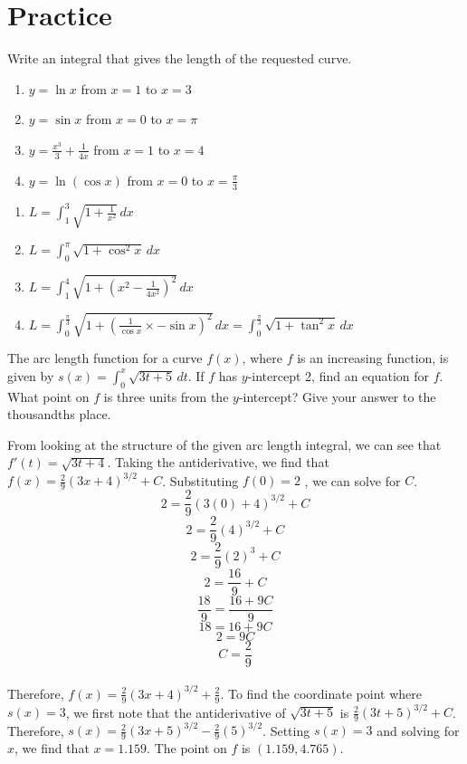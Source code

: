 \section{Practice}

\begin{Exercise}[label=length1]
Write an integral that gives the length of the requested curve.
	\begin{enumerate}
	\item $y = \ln{x}$ from $x = 1$ to $x = 3$
	\item $y = \sin{x}$ from $x = 0$ to $x = \pi$
	\item $y = \frac{x^3}{3} + \frac{1}{4x}$ from $x = 1$ to $x = 4$
	\item $y = \ln{(\cos{x})}$ from $x = 0$ to $x = \frac{\pi}{3}$
	\end{enumerate}	 
\end{Exercise}

\begin{Answer}[ref=length1]
	\begin{enumerate}
	\item $L = \int_{1}^{3} \sqrt{1 + \frac{1}{x^2}}\,dx$
	\item $L = \int_{0}^{\pi} \sqrt{1 + \cos^2{x}}\,dx$
	\item $L = \int_{1}^{4} \sqrt{1 + (x^2-\frac{1}{4x^2})^2}\,dx$
	\item $L = \int_{0}^{\frac{\pi}{3}} \sqrt{1 + (\frac{1}{\cos{x}} 
	\times - \sin{x})^2}\,dx = \int_{0}^{\frac{\pi}{3}} \sqrt{1 + 
	\tan^2{x}}\,dx$
	\end{enumerate}
\end{Answer}

\begin{Exercise}[label=length2]
The arc length function for a curve $f(x)$, where $f$ is an increasing 
function, is given by $s(x) = \int_{0}^{x} \sqrt{3t + 5}\,dt$. If $f$ 
has $y$-intercept 2, find an equation for $f$. What point on $f$ is 
three units from the $y$-intercept? Give your answer to the thousandths 
place. 
\end{Exercise}

\begin{Answer}[ref=length2]
From looking at the structure of the given arc length integral, we can 
see that $f'(t) = \sqrt{3t + 4}$. Taking the antiderivative, we find 
that $f(x) = \frac{2}{9}(3x + 4)^{3 / 2} + C$. Substituting $f(0) = 2$
, we can solve for $C$. $$2 = \frac{2}{9}(3(0) + 4)^{3 / 2} + C$$ 
$$2 = \frac{2}{9}(4)^{3 / 2} + C$$ 
$$2 = \frac{2}{9}(2)^3 + C$$ 
$$2 = \frac{16}{9} + C$$ 
$$\frac{18}{9} = \frac{16 + 9C}{9}$$ 
$$18 = 16 + 9C$$ 
$$2 = 9C$$ 
$$C = \frac{2}{9}$$\\ 
Therefore, $f(x) = \frac{2}{9}(3x + 4)^{3 / 2} + \frac{2}{9}$. To find 
the coordinate point where $s(x) = 3$, we first note that the 
antiderivative of $\sqrt{3t + 5}$ is $\frac{2}{9}(3t + 5)^{3 / 2} + C$. 
Therefore, $s(x) = \frac{2}{9}(3x + 5)^{3 / 2} - \frac{2}{9}(5)^{3 / 2}$. 
Setting $s(x) = 3$ and solving for $x$, we find that $x = 1.159$. The point on $f$ is $(1.159, 4.765)$.
\end{Answer}

